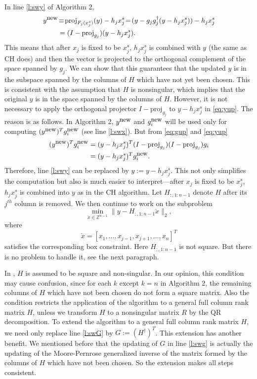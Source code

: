 \documentclass[12pt,Bold,letterpaper]{mcgilletdclass}
\newcommand{\be}{\begin{equation}}
\newcommand{\ee}{\end{equation}}
\begin{document}
In line \ref{l:swy} of Algorithm 2,
\begin{align}
y^{\small \mbox{new}} & \!\equiv\! \mbox{proj}_{F_j(x_j^s)}(y) - h_jx_j^s 
 \!=\! (y -  g_jg_j^\dag(y-h_jx_j^s)) - h_jx_j^s  \nonumber \\
   &=  (I-\mbox{proj}_{g_j})(y-h_jx_j^s). \label{eq:yup}  
\end{align}
This means that after $x_j$ is fixed to be $x_j^s$, $h_jx_j^s$ is combined with $y$ (the same
as CH does)  and then the vector is projected to the orthogonal complement of 
the space spanned by $g_j$. 
We can show that this guarantees that the updated $y$ is in the subspace spanned by
the columns of $H$ which have not yet been chosen.
This is consistent with the assumption that $H$ is nonsingular, which implies that 
the original $y$  is in the space spanned by  the columns of $H$.
However, it is not necessary to apply the orthogonal projector $I- \mbox{proj}_{g_j}$ to $y-h_jx_j^s$ in \eqref{eq:yup}.
The reason is as follows. 
In Algorithm 2, $y^{\small \mbox{new}}$ and $g_i^{\small \mbox{new}}$ will be used only for computing 
$(y^{\small \mbox{new}})^Tg_i^{\small \mbox{new}}$ (see line \ref{l:swx}).
But from \eqref{eq:gup} and \eqref{eq:yup}
\begin{align*}
(y^{\small \mbox{new}})^Tg_i^{\small \mbox{new}}
& =(y-h_jx_j^s)^T(I-\mbox{proj}_{g_j})(I-\mbox{proj}_{g_j})g_i \\
&=(y-h_jx_j^s)^Tg_i^{\small \mbox{new}}.
\end{align*}
Therefore, line \ref{l:swy} can be replaced by $y:=y-h_jx_j^s$.
This not only simplifies the computation but also is much easier to interpret---after $x_j$ is fixed to be $x_j^s$,  
$h_jx_j^s$ is combined into $y$ as in the CH algorithm.
Let $H_{:,1:n-1}$ denote $H$ after its $j^{th}$ column is removed. 
We then continue to work on the subproblem
\be
\min_{\check{x}\in \mathbb{Z}^{n-1}}\|y-H_{:,1:n-1}\check{x}\|_2, 
\label{eq:subs}
\ee
where $$\check{x}=[x_1,\ldots,x_{j-1},x_{j+1},\ldots,x_n]^T$$ 
satisfies the corresponding box constraint.
Here $H_{:,1:n-1}$ is not square. But there is no problem to handle
it, see the next paragraph.

In \cite{SuW05},  $H$ is assumed to be square and non-singular. 
In our opinion, this condition may cause confusion,
since for each $k$ except $k=n$ in Algorithm 2, 
the remaining columns of $H$ which have not been chosen do not form a square matrix.
Also the condition restricts the application of the algorithm to a general full column rank matrix $H$,
unless we transform $H$ to a nonsingular matrix $R$ by the QR decomposition.
To extend the algorithm to a general full column rank matrix $H$, we need only 
replace line \ref{l:swG} by $G:=(H^{\dagger})^T$.
This extension has another benefit. 
We mentioned before that the updating of $G$ in line \ref{l:swg}
is actually the updating of the Moore-Pernrose generalized inverse 
of the matrix formed by the columns of $H$ which have not been chosen. 
So the extension makes all steps consistent.
\end{document}
